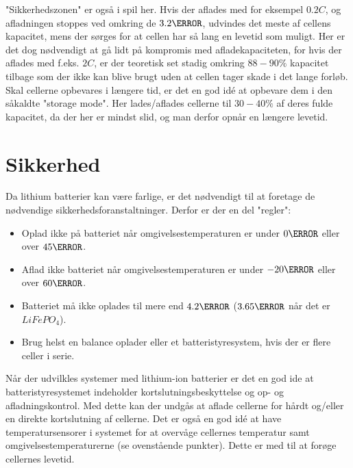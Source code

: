 "Sikkerhedszonen" \space er også i spil her. Hvis der aflades med for eksempel $0.2C$, og afladningen stoppes ved omkring de $3.2\volt$, udvindes det meste af cellens kapacitet, mens der sørges for at cellen har så lang en levetid som muligt. Her er det dog nødvendigt at gå lidt på kompromis med afladekapaciteten, for hvis der aflades med f.eks. $2C$, er der teoretisk set stadig omkring $88-90\percent$ kapacitet tilbage som der ikke kan blive brugt uden at cellen tager skade i det lange forløb. \\

Skal cellerne opbevares i længere tid, er det en god idé at opbevare dem i den såkaldte "storage mode". Her lades/aflades cellerne til $30-40\percent$ af deres fulde kapacitet, da der her er mindst slid, og man derfor opnår en længere levetid. 

\section{Sikkerhed}
Da lithium batterier kan være farlige, er det nødvendigt til at foretage de nødvendige sikkerhedsforanstaltninger. Derfor er der en del "regler":

\begin{itemize}[noitemsep]
\item Oplad ikke på batteriet når omgivelsestemperaturen er under $0\degreeCelsius$ eller over $45\degreeCelsius$. 
\item Aflad ikke batteriet når omgivelsestemperaturen er under $-20\degreeCelsius$ eller over $60\degreeCelsius$.
\item Batteriet må ikke oplades til mere end $4.2\volt$ ($3.65\volt$ når det er $LiFePO_4$).
\item Brug helst en balance oplader eller et batteristyresystem, hvis der er flere celler i serie.
\end{itemize}

Når der udvilkles systemer med lithium-ion batterier er det en god ide at batteristyresystemet indeholder kortslutningsbeskyttelse og op- og afladningskontrol. Med dette kan der undgås at aflade cellerne for hårdt og/eller en direkte kortslutning af cellerne. Det er også en god idé at have temperatursensorer i systemet for at overvåge cellernes temperatur samt omgivelsestemperaturerne (se ovenstående punkter). Dette er med til at forøge cellernes levetid. 

